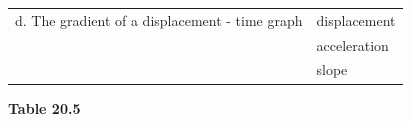 \begin{enumerate}[noitemsep, label=\textbf{\arabic*}. ]
{\begin{center}
\begin{xtabular*}{\mytablewidth}[t]{|p{10\mystarwidth}|p{10\mystarwidth}|}
    
        d. The gradient of a displacement - time graph &
    
    
        displacement%
     \tabularnewline{}
    
    
         &
    
    
        acceleration%
     \tabularnewline{}
    
    
         &
    
    
        slope%
     \tabularnewline{}
    \end{xtabular*}
      \end{center}
    \begin{center}{\small\bfseries Table 20.5}\end{center}
    
    \addtocounter{footnote}{-0}
    
        }%
      

\end{enumerate}
